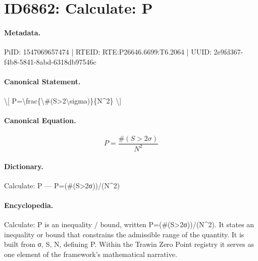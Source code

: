 \section*{ID6862: Calculate: P}
\paragraph{Metadata.}
PiID: 1547069657474 | RTEID: RTE:P26646.6699:T6.2064 | UUID: 2e9fd367-f4b8-5841-8abd-6318db97546c

\paragraph{Canonical Statement.}
\textbackslash{}[ P=\textbackslash{}frac\{\textbackslash{}\#(S>2\textbackslash{}sigma)\}\{N\textasciicircum{}2\} \textbackslash{}]

\paragraph{Canonical Equation.}
\[
P=\frac{\#(S>2\sigma)}{N^2}
\]

\paragraph{Dictionary.}
Calculate: P — P=(\#(S>2σ))/(N\textasciicircum{}2)

\paragraph{Encyclopedia.}
Calculate: P is an inequality / bound, written P=(\#(S>2σ))/(N\textasciicircum{}2). It states an inequality or bound that constrains the admissible range of the quantity. It is built from σ, S, N, defining P. Within the Trawin Zero Point registry it serves as one element of the framework's mathematical narrative.
